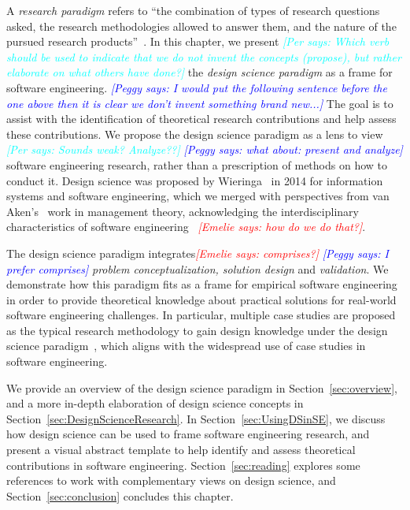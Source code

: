 \documentclass[graybox]{svmult}
\newcommand{\emelie}[1]{\textcolor{red}{{\it [Emelie says: #1]}}}
\newcommand{\peggy}[1]{\textcolor{blue}{{\it [Peggy says: #1]}}}
\newcommand{\per}[1]{\textcolor{cyan}{{\it [Per says: #1]}}}
\newcommand{\emelie}[1]{}
\newcommand{\peggy}[1]{}
\newcommand{\per}[1]{}
\begin{document}
A \emph{research paradigm} refers to ``the combination of types of research questions asked, the research methodologies allowed to answer them, and the nature of the pursued research products''~\cite{van_aken_management_2004}. In this chapter, we present \per{Which verb should be used to indicate that we do not invent the concepts (propose), but rather elaborate on what others have done?} the \emph{design science paradigm} as a frame for software engineering. 
\peggy{I would put the following sentence before the one above then it is clear we don't invent something brand new...}
The goal is to assist with the identification of theoretical research contributions and help assess these contributions. We propose the design science paradigm as a lens to view \per{Sounds weak? Analyze??} 
\peggy{what about: present and analyze} software engineering research, rather than a prescription of methods on how to conduct it. 
Design science was proposed by Wieringa~\cite{wieringa_what_2014} in 2014 for information systems and software engineering, which we merged with perspectives from van Aken's~\cite{van_aken_management_2004} work in management theory, acknowledging the interdisciplinary characteristics of software engineering~\cite{Mendez2019} \emelie{how do we do that?}.

The design science paradigm integrates\emelie{comprises?} \peggy{I prefer comprises} \emph{problem conceptualization, solution design} and \emph{validation}. We demonstrate how this paradigm fits as a frame for empirical software engineering in order to provide theoretical knowledge about practical solutions for real-world software engineering challenges. In particular, multiple case studies are proposed as the typical research methodology to gain design knowledge under the design science paradigm~\cite{van_aken_management_2004}, which aligns with the widespread use of case studies in software engineering. 

We provide an overview of the design science paradigm in Section~\ref{sec:overview}, and a more in-depth elaboration of design science concepts in Section~\ref{sec:DesignScienceResearch}. In Section~\ref{sec:UsingDSinSE}, we discuss how design science can be used to frame software engineering research, and present a visual abstract template to help identify and assess theoretical contributions in software engineering. Section~\ref{sec:reading} explores some references to work with complementary views on design science, and Section~\ref{sec:conclusion} concludes this chapter.
\end{document}
